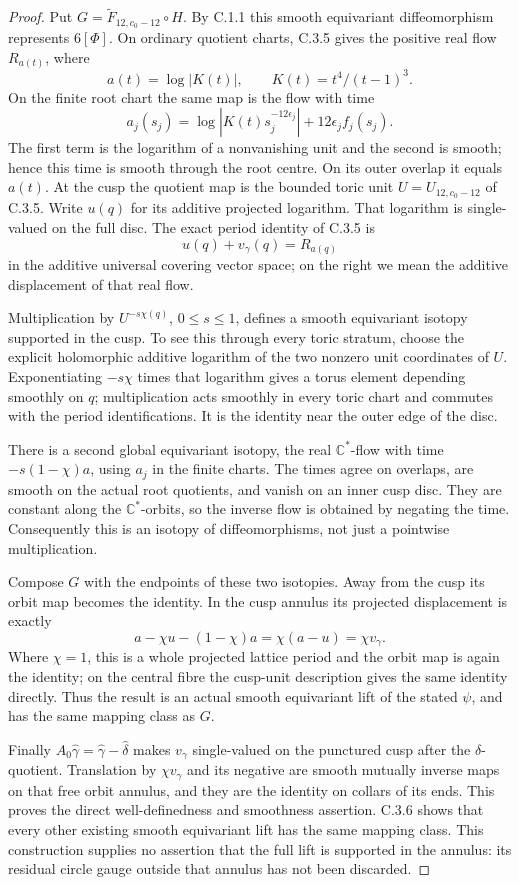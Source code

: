 \begin{proof}
Put $G=\widetilde F_{12,c_0-12}\circ H$. By C.1.1 this smooth
equivariant diffeomorphism represents $6[\Phi]$. On ordinary
quotient charts, C.3.5 gives the positive real flow
$R_{a(t)}$, where
\[
 a(t)=\log|K(t)|,\qquad K(t)=t^4/(t-1)^3.
\]
On the finite root chart the same map is the flow with time
\[
 a_j(s_j)=\log|K(t)s_j^{-12\epsilon_j}|
                       +12\epsilon_j f_j(s_j).
\]
The first term is the logarithm of a nonvanishing unit and the
second is smooth; hence this time is smooth through the root
centre. On its outer overlap it equals $a(t)$. At the cusp the
quotient map is the bounded toric unit $U=U_{12,c_0-12}$ of
C.3.5. Write $u(q)$ for its additive projected logarithm.
That logarithm is single-valued on the full disc. The exact
period identity of C.3.5 is
\[
 u(q)+v_\gamma(q)=R_{a(q)}
\]
in the additive universal covering vector space; on the right
we mean the additive displacement of that real flow.

Multiplication by $U^{-s\chi(q)}$, $0\leq s\leq1$, defines a
smooth equivariant isotopy supported in the cusp. To see this
through every toric stratum, choose the explicit holomorphic
additive logarithm of the two nonzero unit coordinates of $U$.
Exponentiating $-s\chi$ times that logarithm gives a torus
element depending smoothly on $q$; multiplication acts smoothly
in every toric chart and commutes with the period identifications.
It is the identity near the outer edge of the disc.

There is a second global equivariant isotopy, the real
$\mathbb C^*$-flow with time $-s(1-\chi)a$, using $a_j$ in
the finite charts. The times agree on overlaps, are smooth on
the actual root quotients, and vanish on an inner cusp disc.
They are constant along the $\mathbb C^*$-orbits, so the inverse
flow is obtained by negating the time. Consequently this is an
isotopy of diffeomorphisms, not just a pointwise multiplication.

Compose $G$ with the endpoints of these two isotopies. Away
from the cusp its orbit map becomes the identity. In the cusp
annulus its projected displacement is exactly
\[
 a-\chi u-(1-\chi)a=\chi(a-u)=\chi v_\gamma.
\]
Where $\chi=1$, this is a whole projected lattice period and
the orbit map is again the identity; on the central fibre the
cusp-unit description gives the same identity directly. Thus the
result is an actual smooth equivariant lift of the stated $\psi$,
and has the same mapping class as $G$.

Finally $A_0\widehat\gamma=\widehat\gamma-\widehat\delta$
makes $v_\gamma$ single-valued on the punctured cusp after the
$\delta$-quotient. Translation by $\chi v_\gamma$ and its
negative are smooth mutually inverse maps on that free orbit
annulus, and they are the identity on collars of its ends.
This proves the direct well-definedness and smoothness assertion.
C.3.6 shows that every other existing smooth equivariant lift has
the same mapping class. This construction supplies no assertion
that the full lift is supported in the annulus: its residual
circle gauge outside that annulus has not been discarded.
\end{proof}
